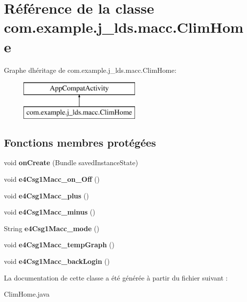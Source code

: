 \hypertarget{a00024}{}\section{Référence de la classe com.\+example.\+j\+\_\+lds.\+macc.\+Clim\+Home}
\label{a00024}
Graphe d\textquotesingle{}héritage de com.\+example.\+j\+\_\+lds.\+macc.\+Clim\+Home\+:\begin{figure}[H]
\begin{center}
\leavevmode
\includegraphics[height=2.000000cm]{a00024}
\end{center}
\end{figure}
\subsection*{Fonctions membres protégées}
\begin{DoxyCompactItemize}
\item 
\mbox{\label{a00024_a5291ba568133ddc3781d5a5c00423103}} 
void {\bfseries on\+Create} (Bundle saved\+Instance\+State)
\item 
\mbox{\label{a00024_a791abf995e0bfbe042b5d232bfa325b4}} 
void {\bfseries e4\+Csg1\+Macc\+\_\+on\+\_\+\+Off} ()
\item 
\mbox{\label{a00024_ac4fe647dbee99df38770804e858146dc}} 
void {\bfseries e4\+Csg1\+Macc\+\_\+plus} ()
\item 
\mbox{\label{a00024_add576228d3eea662639b16bf2af54c93}} 
void {\bfseries e4\+Csg1\+Macc\+\_\+minus} ()
\item 
\mbox{\label{a00024_a85d446f4cf76006b86fadeeeabb43687}} 
String {\bfseries e4\+Csg1\+Macc\+\_\+mode} ()
\item 
\mbox{\label{a00024_a537420aa4584bf16fc192ecdb07b0769}} 
void {\bfseries e4\+Csg1\+Macc\+\_\+temp\+Graph} ()
\item 
\mbox{\label{a00024_aa3393761ce82cd4ffcd83ba3d17690aa}} 
void {\bfseries e4\+Csg1\+Macc\+\_\+back\+Login} ()
\end{DoxyCompactItemize}


La documentation de cette classe a été générée à partir du fichier suivant \+:\begin{DoxyCompactItemize}
\item 
Clim\+Home.\+java\end{DoxyCompactItemize}
